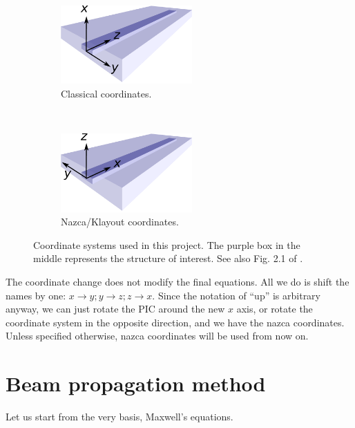 \documentclass[]{article}
\begin{document}
	\begin{figure}[t!]
		\centering
		\begin{subfigure}[t]{0.5\textwidth}
			\centering
			\includegraphics[height=3cm]{coordinates_classic.pdf}
			\caption{Classical coordinates.}
		\end{subfigure}%
		~ 
		\begin{subfigure}[t]{0.5\textwidth}
			\centering
			\includegraphics[height=3cm]{coordinates_nazca.pdf}
			\caption{Nazca/Klayout coordinates.}
		\end{subfigure}
		\caption{Coordinate systems used in this project. The purple box in the middle represents the structure of interest. See also Fig. 2.1 of \cite{Lifante_2015}.\label{fig:coordinates}}
	\end{figure}
	
	The coordinate change does not modify the final equations. All we do is shift the names by one: $x \to y; y \to z; z \to x$. Since the notation of ``up'' is arbitrary anyway, we can just rotate the PIC around the new $x$ axis, or rotate the coordinate system in the opposite direction, and we have the nazca coordinates.\\
	
	Unless specified otherwise, nazca coordinates will be used from now on.
	
	
	\section{Beam propagation method}
	Let us start from the very basis, Maxwell's equations.
\end{document}
